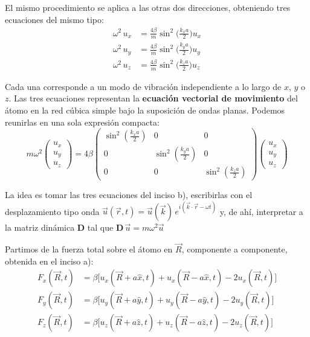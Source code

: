 \documentclass{article}
\begin{document}
El mismo procedimiento se aplica a las otras dos direcciones, obteniendo tres ecuaciones del mismo tipo:
\begin{equation}
\boxed{
\begin{aligned}
\omega^2\,u_x&=\tfrac{4\beta}{m}\sin^2\!\Big(\tfrac{k_x a}{2}\Big)u_x\\[4pt]
\omega^2\,u_y&=\tfrac{4\beta}{m}\sin^2\!\Big(\tfrac{k_y a}{2}\Big)u_y\\[4pt]
\omega^2\,u_z&=\tfrac{4\beta}{m}\sin^2\!\Big(\tfrac{k_z a}{2}\Big)u_z
\end{aligned}}
\label{eq:ecuaciones_cartesianas}
\end{equation}

Cada una corresponde a un modo de vibración independiente a lo largo de \(x\), \(y\) o \(z\).  
Las tres ecuaciones representan la \textbf{ecuación vectorial de movimiento} del átomo en la red cúbica simple bajo la suposición de ondas planas.  
Podemos reunirlas en una sola expresión compacta:
\begin{equation}
\boxed{
m\omega^2
\begin{pmatrix}
u_x\\u_y\\u_z
\end{pmatrix}
=
4\beta
\begin{pmatrix}
\sin^2(\tfrac{k_x a}{2})&0&0\\[4pt]
0&\sin^2(\tfrac{k_y a}{2})&0\\[4pt]
0&0&\sin^2(\tfrac{k_z a}{2})
\end{pmatrix}
\begin{pmatrix}
u_x\\u_y\\u_z
\end{pmatrix}
}
\label{eq:ecuacion_vectorial_movimiento}
\end{equation}


\;

La idea es tomar las tres ecuaciones del inciso b), escribirlas con el desplazamiento tipo onda
\(\vec u(\vec r,t)=\vec u(\vec k)\,e^{i(\vec k\cdot\vec r-\omega t)}\) y, de ahí, interpretar a la matriz dinámica \(\mathbf D\) tal que \(\mathbf D\,\vec u=m\omega^2\vec u\)

\medskip
Partimos de la fuerza total sobre el átomo en \(\vec R\), componente a componente, obtenida en el inciso a):
\begin{equation}
\boxed{
\begin{aligned}
F_x(\vec R,t)&=\beta\Big[u_x(\vec R{+}a\hat x,t)+u_x(\vec R{-}a\hat x,t)-2u_x(\vec R,t)\Big]\\
F_y(\vec R,t)&=\beta\Big[u_y(\vec R{+}a\hat y,t)+u_y(\vec R{-}a\hat y,t)-2u_y(\vec R,t)\Big]\\
F_z(\vec R,t)&=\beta\Big[u_z(\vec R{+}a\hat z,t)+u_z(\vec R{-}a\hat z,t)-2u_z(\vec R,t)\Big]
\end{aligned}}
\label{eq:c_fuerza_total}
\end{equation}
\end{document}
